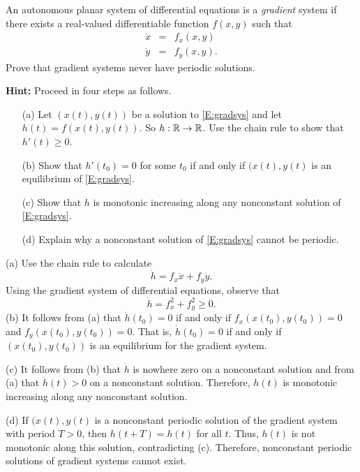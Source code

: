 \documentclass{ximera}
\begin{document}
\begin{exercise} \label{c8.3.5}
An autonomous planar system of differential equations is a {\em gradient\/} 
 system if there exists a real-valued differentiable function 
$f(x,y)$ such that 
\begin{equation} \label{E:gradsys}
\begin{array}{rcl}
\dot{x} & = & f_x(x,y) \\
\dot{y} & = & f_y(x,y).
\end{array}
\end{equation}
Prove that gradient systems never have periodic solutions.  

{\bf Hint:} Proceed in four steps as follows.
\begin{itemize}
\item[(a)]  Let $(x(t),y(t))$ be a solution to \eqref{E:gradsys} and let 
$h(t)=f(x(t),y(t))$.  So $h:\mbox{$\Bbb{R}$}\to\mbox{$\Bbb{R}$}$.  Use the chain rule to show that 
$h'(t)\geq 0$.
\item[(b)]  Show that $h'(t_0) = 0$ for some $t_0$ if and only if 
$(x(t),y(t)$ is an equilibrium of  \eqref{E:gradsys}.
\item[(c)]  Show that $h$ is monotonic increasing along any nonconstant 
solution of \eqref{E:gradsys}. 
\item[(d)]  Explain why a nonconstant solution of \eqref{E:gradsys} cannot be 
periodic.
\end{itemize}

\begin{solution}

\soln (a)  Use the chain rule to calculate
\[
\dot{h} = f_x\dot{x}+f_y\dot{y}.
\]
Using the gradient system of differential equations, observe that
\[
\dot{h} = f_x^2 + f_y^2\ge 0.
\]
(b) It follows from (a) that $\dot{h}(t_0)=0$ if and only if 
$f_x(x(t_0),y(t_0))=0$ and $f_y(x(t_0),y(t_0))=0$.  That is, 
$\dot{h}(t_0)=0$ if and only if $(x(t_0),y(t_0))$ is an equilibrium for the
gradient system.

\noindent (c) It follows from (b) that $\dot{h}$ is nowhere zero on a
nonconstant solution and from (a) that $\dot{h}(t)>0$ on a nonconstant
solution.  Therefore, $h(t)$ is monotonic increasing along any nonconstant
solution.

\noindent (d)  If $(x(t),y(t)$ is a nonconstant periodic solution of the
gradient system with period $T>0$, then $h(t+T)=h(t)$ for all $t$.  Thus,
$h(t)$ is not monotonic along this solution, contradicting (c).  Therefore,
nonconstant periodic solutions of gradient systems cannot exist.  

\end{solution}
\end{exercise}
\end{document}
